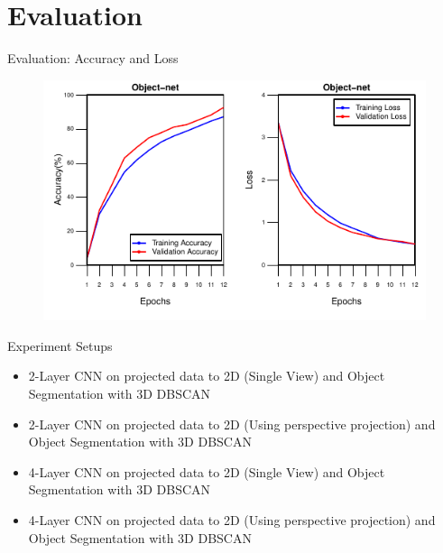 \documentclass[9pt]{beamer}
\begin{document}

\section{Evaluation}


\begin{frame}[fragile]{Evaluation: Accuracy and Loss }
	\begin{figure}
		\centering
		\includegraphics[width=\textwidth]{images/one_to_one.pdf}

	\end{figure}
\end{frame}

\begin{frame}[fragile]{Experiment Setups }
\begin{itemize}
	\item 2-Layer CNN on projected data to 2D (Single View) and Object Segmentation with 3D DBSCAN
	\item 2-Layer CNN on projected data to 2D (Using perspective projection) and Object Segmentation with 3D DBSCAN
	\item 4-Layer CNN on projected data to 2D (Single View) and Object Segmentation with 3D DBSCAN
	\item 4-Layer CNN on projected data to 2D (Using perspective projection) and Object Segmentation with 3D DBSCAN
\end{itemize}

\end{frame}
\end{document}
